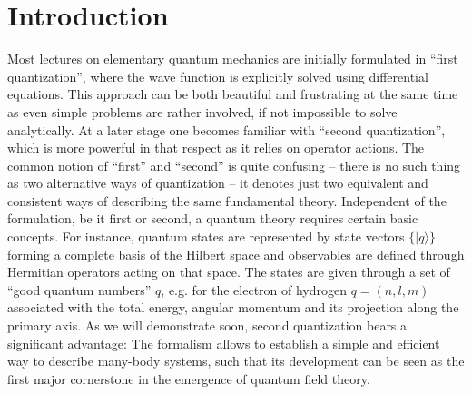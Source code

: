 %
\chapter*{Introduction}
%
Most lectures on elementary quantum mechanics are initially formulated in ``first quan\-ti\-zation'', where the wave function is explicitly solved using differential equations.
This approach can be both beautiful and frustrating at the same time as even simple problems are rather involved, if not impossible to solve analytically.
At a later stage one becomes familiar with ``second quantization'', which is more powerful in that respect as it relies on operator actions.
The common notion of ``first'' and ``second'' is quite confusing -- there is no such thing as two alternative ways of quantization -- it denotes just two equivalent and consistent ways of describing the same fundamental theory.
Independent of the formulation, be it first or second, a quantum theory requires certain basic concepts.
For instance, quantum states are represented by state vectors $\{|q\rangle\}$ forming a complete basis of the Hilbert space and observables are defined through Hermitian operators acting on that space.
The states are given through a set of ``good quantum numbers'' $q$, e.g. for the electron of hydrogen $q=(n,l,m)$ associated with the total energy, angular momentum and its projection along the primary axis.
As we will demonstrate soon, second quantization bears a significant advantage: The formalism allows to establish a simple and efficient way to describe many-body systems, such that its development can be seen as the first major cornerstone in the emergence of quantum field theory.

